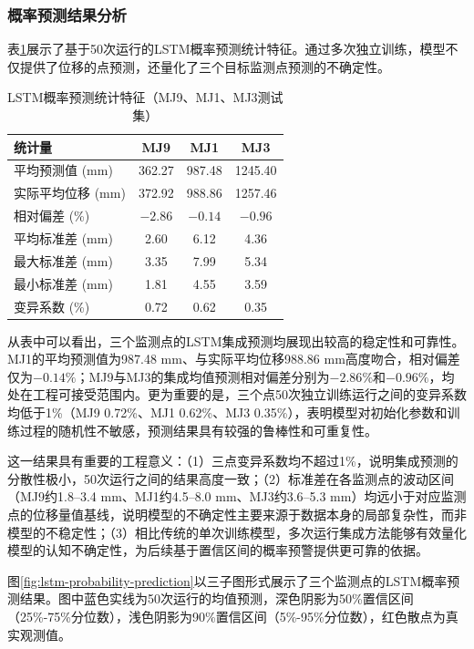 \documentclass[12pt,a4paper]{article}
\newcommand{\tabcaption}[2]{%
  \caption[#1]{{\CJKfamily{songbold}#1}}}
\begin{document}
\subsubsection{概率预测结果分析}

表\ref{tab:lstm-probability-stats}展示了基于50次运行的LSTM概率预测统计特征。通过多次独立训练，模型不仅提供了位移的点预测，还量化了三个目标监测点预测的不确定性。

\begin{table}[htbp]
\centering
\tabcaption{LSTM概率预测统计特征（MJ9、MJ1、MJ3测试集）}{Statistical Characteristics of LSTM Probabilistic Prediction (Test Set for MJ9, MJ1, MJ3)}
\label{tab:lstm-probability-stats}
\begin{tabular}{lccc}
\toprule
统计量 & MJ9 & MJ1 & MJ3 \\
\midrule
平均预测值 (mm) & 362.27 & 987.48 & 1245.40 \\
实际平均位移 (mm) & 372.92 & 988.86 & 1257.46 \\
相对偏差 (\%) & $-2.86$ & $-0.14$ & $-0.96$ \\
平均标准差 (mm) & 2.60 & 6.12 & 4.36 \\
最大标准差 (mm) & 3.35 & 7.99 & 5.34 \\
最小标准差 (mm) & 1.81 & 4.55 & 3.59 \\
变异系数 (\%) & 0.72 & 0.62 & 0.35 \\
\bottomrule
\end{tabular}
\end{table}

从表中可以看出，三个监测点的LSTM集成预测均展现出较高的稳定性和可靠性。MJ1的平均预测值为987.48 mm、与实际平均位移988.86 mm高度吻合，相对偏差仅为$-0.14\%$；MJ9与MJ3的集成均值预测相对偏差分别为$-2.86\%$和$-0.96\%$，均处在工程可接受范围内。更为重要的是，三个点50次独立训练运行之间的变异系数均低于1\%（MJ9 0.72\%、MJ1 0.62\%、MJ3 0.35\%），表明模型对初始化参数和训练过程的随机性不敏感，预测结果具有较强的鲁棒性和可重复性。

这一结果具有重要的工程意义：（1）三点变异系数均不超过1\%，说明集成预测的分散性极小，50次运行之间的结果高度一致；（2）标准差在各监测点的波动区间（MJ9约1.8--3.4 mm、MJ1约4.5--8.0 mm、MJ3约3.6--5.3 mm）均远小于对应监测点的位移量值基线，说明模型的不确定性主要来源于数据本身的局部复杂性，而非模型的不稳定性；（3）相比传统的单次训练模型，多次运行集成方法能够有效量化模型的认知不确定性，为后续基于置信区间的概率预警提供更可靠的依据。

图\ref{fig:lstm-probability-prediction}以三子图形式展示了三个监测点的LSTM概率预测结果。图中蓝色实线为50次运行的均值预测，深色阴影为50\%置信区间（25\%-75\%分位数），浅色阴影为90\%置信区间（5\%-95\%分位数），红色散点为真实观测值。
\end{document}
